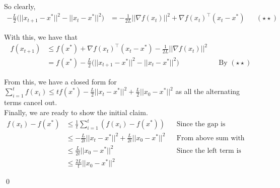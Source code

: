 \documentclass[a4paper]{article}
\begin{document}
So clearly,
\begin{align*}
    -\frac{L}{2} \Big( ||x_{t+1} - x^*||^2 - ||x_t - x^*||^2 \Big)
    &= -\frac{1}{2L} ||\nabla f(x_t)||^2 + \nabla f(x_t)^\intercal (x_t - x^*) && (\star \star)
\end{align*}

With this, we have that
\begin{align*}
    f(x_{t+1})
    &\leq f(x^*) + \nabla f(x_t)^\intercal (x_t - x^*) - \frac{1}{2L} ||\nabla f(x_t)||^2 \\
    &= f(x^*) - \frac{L}{2} \Big( ||x_{t+1} - x^*||^2 - ||x_t - x^*||^2 \Big) && \text{By } (\star \star)
\end{align*}

From this, we have a closed form for $\sum_{i=1}^t f(x_i) \leq t f(x^*) - \frac{L}{2} ||x_t - x^*||^2 + \frac{L}{2} ||x_0 - x^*||^2$ as all the alternating terms cancel out. \\

Finally, we are ready to show the initial claim.
\begin{align*}
    f(x_t) - f(x^*)
    &\leq \frac{1}{t} \sum_{i=1}^t (f(x_i) - f(x^*)) && \text{Since the gap is decreasing} \\
    &\leq -\frac{L}{2t} ||x_t - x^*||^2 + \frac{L}{2t} ||x_0 - x^*||^2 && \text{From above sum with algebra} \\
    &\leq \frac{L}{2t} ||x_0 - x^*||^2 && \text{Since the left term is negative} \\
    &\leq \frac{2L}{t} ||x_0 - x^*||^2
\end{align*}

\qed
\end{document}
